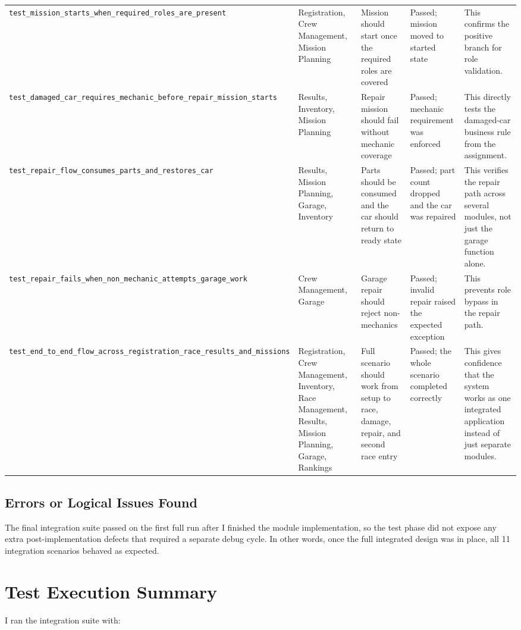 \documentclass[12pt]{article}
\begin{document}
\begin{longtable}{p{}p{}p{}p{}p{}}
\texttt{test\_mission\_starts\_when\_required\_roles\_are\_present} & Registration, Crew Management, Mission Planning & Mission should start once the required roles are covered & Passed; mission moved to started state & This confirms the positive branch for role validation. \\
\texttt{test\_damaged\_car\_requires\_mechanic\_before\_repair\_mission\_starts} & Results, Inventory, Mission Planning & Repair mission should fail without mechanic coverage & Passed; mechanic requirement was enforced & This directly tests the damaged-car business rule from the assignment. \\
\texttt{test\_repair\_flow\_consumes\_parts\_and\_restores\_car} & Results, Mission Planning, Garage, Inventory & Parts should be consumed and the car should return to ready state & Passed; part count dropped and the car was repaired & This verifies the repair path across several modules, not just the garage function alone. \\
\texttt{test\_repair\_fails\_when\_non\_mechanic\_attempts\_garage\_work} & Crew Management, Garage & Garage repair should reject non-mechanics & Passed; invalid repair raised the expected exception & This prevents role bypass in the repair path. \\
\texttt{test\_end\_to\_end\_flow\_across\_registration\_race\_results\_and\_missions} & Registration, Crew Management, Inventory, Race Management, Results, Mission Planning, Garage, Rankings & Full scenario should work from setup to race, damage, repair, and second race entry & Passed; the whole scenario completed correctly & This gives confidence that the system works as one integrated application instead of just separate modules. \\
\bottomrule
\end{longtable}

\subsection{Errors or Logical Issues Found}
The final integration suite passed on the first full run after I finished the module implementation, so the test phase did not expose any extra post-implementation defects that required a separate debug cycle. In other words, once the full integrated design was in place, all 11 integration scenarios behaved as expected.

\section{Test Execution Summary}
I ran the integration suite with:
\end{document}

